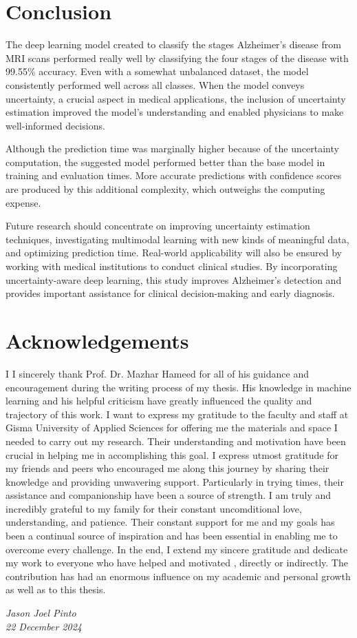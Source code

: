 \documentclass[12pt,onecolumn]{report}
\begin{document}
\chapter{Conclusion}
The deep learning model created to classify the stages Alzheimer's disease from MRI scans performed really well by classifying the four stages of the disease with 99.55\% accuracy. Even with a somewhat unbalanced dataset, the model consistently performed well across all classes. When the model conveys uncertainty, a crucial aspect in medical applications, the inclusion of uncertainty estimation improved the model's understanding and enabled physicians to make well-informed decisions.

Although the prediction time was marginally higher because of the uncertainty computation, the suggested model performed better than the base model in training and evaluation times. More accurate predictions with confidence scores are produced by this additional complexity, which outweighs the computing expense.

Future research should concentrate on improving uncertainty estimation techniques, investigating multimodal learning with new kinds of meaningful data, and optimizing prediction time. Real-world applicability will also be ensured by working with medical institutions to conduct clinical studies. By incorporating uncertainty-aware deep learning, this study improves Alzheimer's detection and provides important assistance for clinical decision-making and early diagnosis.


\chapter*{Acknowledgements}

I I sincerely thank Prof. Dr. Mazhar Hameed for all of his guidance and encouragement during the writing process of my thesis. His knowledge in machine learning and his helpful criticism have greatly influenced the quality and trajectory of this work.
I want to express my gratitude to the faculty and staff at Gisma University of Applied Sciences for offering me the materials and space I needed to carry out my research. Their understanding and motivation have been crucial in helping me in accomplishing this goal.
I express utmost gratitude for my friends and peers who encouraged me along this journey by sharing their knowledge and providing unwavering support. Particularly in trying times, their assistance and companionship have been a source of strength.
I am truly and incredibly grateful to my family for their constant uncomditional love, understanding, and patience. Their constant support for me and my goals has been a continual source of inspiration and has been essential in enabling me to overcome every challenge.
In the end, I extend my sincere gratitude and dedicate my work to everyone who have helped and motivated , directly or indirectly. The contribution has had an enormous influence on my academic and personal growth as well as to this thesis.


\begin{flushright}
\textit{Jason Joel Pinto} \\
\textit{22 December 2024}
\end{flushright}


\cleardoublepage
\printbibliography
\end{document}
